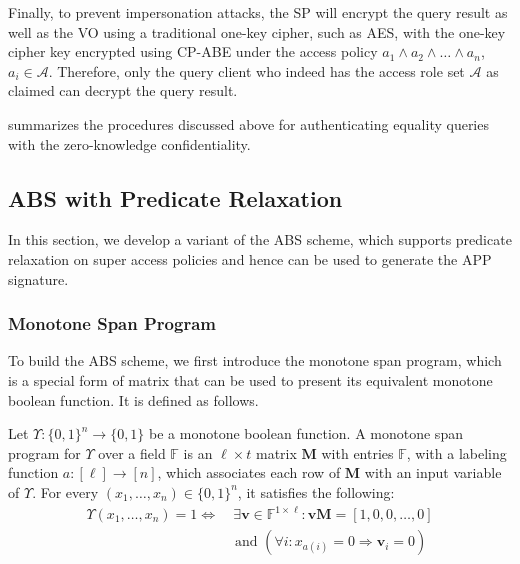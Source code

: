 Finally, to prevent impersonation attacks, the SP will encrypt the query result as well as the VO using a traditional one-key cipher, such as AES, with the one-key cipher key encrypted using CP-ABE under the access policy $a_1 \land a_2 \land \dots \land a_n$, $a_i \in \mathcal{A}$. Therefore, only the query client who indeed has the access role set $\mathcal{A}$ as claimed can decrypt the query result.

 summarizes the procedures discussed above for authenticating equality queries with the zero-knowledge confidentiality.
\subsection{ABS with Predicate Relaxation}\label{sec:access-control:abs}

In this section, we develop a variant of the ABS scheme, which supports predicate relaxation on super access policies and hence can be used to generate the APP signature\@.

\subsubsection{Monotone Span Program}\label{sec:access-control:msp}

To build the ABS scheme, we first introduce the monotone span program, which is a special form of matrix that can be used to present its equivalent monotone boolean function. It is defined as follows.

\begin{definition}
  Let $\Upsilon : {\{0, 1\}}^n \to \{0, 1\}$ be a monotone boolean function. A monotone span program for $\Upsilon$ over a field $\mathbb{F}$ is an $\ell \times t$ matrix $\mathbf{M}$ with entries $\mathbb{F}$, with a labeling function $a: [\ell] \to [n]$, which associates each row of $\mathbf{M}$ with an input variable of $\Upsilon$. For every $(x_1, \dots, x_n) \in {\{0, 1\}}^n$, it satisfies the following:
  \begin{align*}
    \Upsilon(x_1, \dots, x_n) = 1 \Longleftrightarrow & \ \exists \mathbf{v} \in \mathbb{F}^{1 \times \ell}: \mathbf{v}\mathbf{M} = [1, 0, 0, \dots, 0] \\
                                                      & \text{ and } (\forall i: x_{a(i)} = 0 \Rightarrow \mathbf{v}_i = 0)
  \end{align*}
\end{definition}

